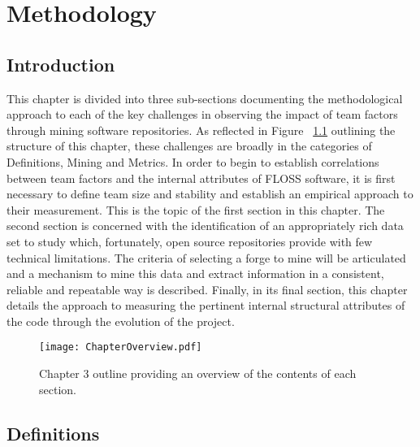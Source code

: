 
\graphicspath{{Chapter3/Figures/}{Chapter3/Tables/}{Chapter3/Charts/}}

\chapter{Methodology}

\section{Introduction} %

This chapter is divided into three sub-sections documenting the methodological approach to each of the key challenges in observing the impact of team factors through mining software repositories. As reflected in Figure ~\ref{fig:chapteroverview} outlining the structure of this chapter, these challenges are broadly in the categories of Definitions, Mining and Metrics. In order to begin to establish correlations between team factors and the internal attributes of FLOSS software, it is first necessary to define team size and stability and establish an empirical approach to their measurement. This is the topic of the first section in this chapter. The second section is concerned with the identification of an appropriately rich data set to study which, fortunately, open source repositories provide with few technical limitations. The criteria of selecting a forge to mine will be articulated and a mechanism to mine this data and extract information in a consistent, reliable and repeatable way is described. Finally, in its final section, this chapter details the approach to measuring the pertinent internal structural attributes of the code through the evolution of the project. 
 
\begin{landscape}
\begin{figure}[htbp!] 
\centering    
\texttt{[image: ChapterOverview.pdf]}
\caption{Chapter 3 outline providing an overview of the contents of each section.}
\label{fig:chapteroverview}
\end{figure}
\end{landscape}

\section{Definitions} %
